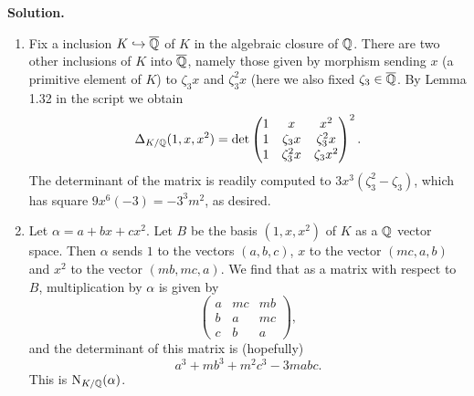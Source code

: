 \documentclass[a4paper,11pt]{article}
\begin{document}
\textbf{Solution.} 
\begin{enumerate}
    \item Fix a inclusion $K \hookrightarrow \overline {\mathbb{Q}}$ of $K$ in the algebraic closure of $\mathbb{Q}$.
        There are two other inclusions of $K$ into $\overline {\mathbb{Q}}$, namely those given by
        morphism sending $x$ (a primitive element of $K$) to $\zeta_3 x$ and
        $\zeta_3^2 x$ (here we also fixed $\zeta_3 \in \overline {\mathbb{Q}}$. By Lemma
        1.32 in the script we obtain
        \begin{equation*}
            \Delta_{K/\mathbb{Q}}(1,x,x^2) = \det \begin{pmatrix}
                                            1 & x & x^2 \\
                                            1 & \zeta_3 x & \zeta_3^2 x \\
                                            1 & \zeta_3^2 x & \zeta_3 x^2
                                          \end{pmatrix}^2.
        \end{equation*}
        The determinant of the matrix is readily computed to $3x^3(\zeta_3^2 - 
        \zeta_3)$, which has square $9x^6(-3) = -3^3m^2$, as desired.

    \item Let $\alpha = a + bx + cx^2$. Let $B$ be the basis $(1,x,x^2)$ of $K$
        as a $\mathbb{Q}$ vector space. Then $\alpha$ sends $1$ to the vectors
        $(a,b,c)$, $x$ to the vector $(mc, a, b)$ and $x^2$ to the vector
        $(mb, mc, a)$. We find that as a matrix with respect to $B$, 
        multiplication by $\alpha$ is given by
        \begin{equation*}
            \begin{pmatrix} 
                a  & mc & mb \\
                b  & a  & mc  \\
                c  & b  & a
            \end{pmatrix},
        \end{equation*}
        and the determinant of this matrix is (hopefully)
        \begin{equation*}
            a^3 + mb^3 + m^2 c^3 - 3mabc.
        \end{equation*}
        This is $\operatorname{N}_{K/\mathbb{Q}}(\alpha)$.
\end{enumerate}
\end{document}
